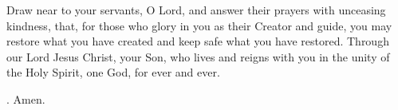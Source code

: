 \lettrine[lines=3]{D}{}raw near to your servants, O Lord,
and answer their prayers with unceasing kindness,
that, for those who glory in you as their Creator and guide,
you may restore what you have created
and keep safe what you have restored.
Through our Lord Jesus Christ, your Son,
who lives and reigns with you in the unity of the Holy Spirit,
one God, for ever and ever. \par \Rbar. Amen.
